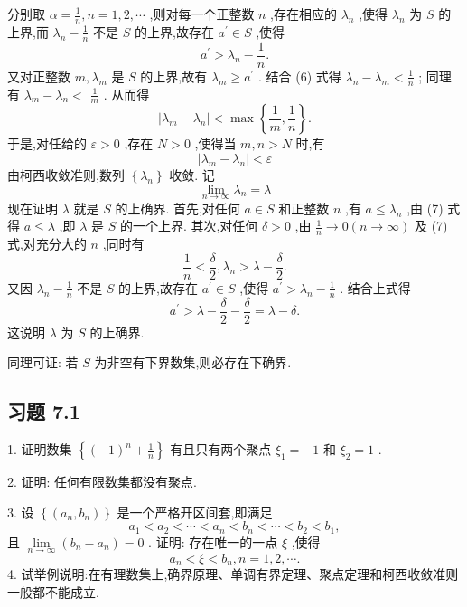 分别取 \(\alpha  = \frac{1}{n},n = 1,2,\cdots\) ,则对每一个正整数 \(n\) ,存在相应的 \({\lambda }_{n}\) ,使得 \({\lambda }_{n}\) 为 \(S\) 的上界,而 \({\lambda }_{n} - \frac{1}{n}\) 不是 \(S\) 的上界,故存在 \({a}^{\prime } \in  S\) ,使得
\[
{a}^{\prime } > {\lambda }_{n} - \frac{1}{n}. \tag{6}
\]
又对正整数 \(m,{\lambda }_{m}\) 是 \(S\) 的上界,故有 \({\lambda }_{m} \geq  {a}^{\prime }\) . 结合 (6) 式得 \({\lambda }_{n} - {\lambda }_{m} < \frac{1}{n}\) ; 同理有 \({\lambda }_{m} - {\lambda }_{n} <\)  \(\frac{1}{m}\) . 从而得
\[
\left| {{\lambda }_{m} - {\lambda }_{n}}\right|  < \max \left\{  {\frac{1}{m},\frac{1}{n}}\right\}  .
\]
于是,对任给的 \(\varepsilon  > 0\) ,存在 \(N > 0\) ,使得当 \(m,n > N\) 时,有
\[
\left| {{\lambda }_{m} - {\lambda }_{n}}\right|  < \varepsilon
\]
由柯西收敛准则,数列 \(\left\{  {\lambda }_{n}\right\}\) 收敛. 记
\[
\mathop{\lim }\limits_{{n \rightarrow  \infty }}{\lambda }_{n} = \lambda  \tag{7}
\]
现在证明 \(\lambda\) 就是 \(S\) 的上确界. 首先,对任何 \(a \in  S\) 和正整数 \(n\) ,有 \(a \leq  {\lambda }_{n}\) ,由 (7) 式得 \(a \leq  \lambda\) ,即 \(\lambda\) 是 \(S\) 的一个上界. 其次,对任何 \(\delta  > 0\) ,由 \(\frac{1}{n} \rightarrow  0\left( {n \rightarrow  \infty }\right)\) 及 (7) 式,对充分大的 \(n\) ,同时有
\[
\frac{1}{n} < \frac{\delta }{2},{\lambda }_{n} > \lambda  - \frac{\delta }{2}.
\]
又因 \({\lambda }_{n} - \frac{1}{n}\) 不是 \(S\) 的上界,故存在 \({a}^{\prime } \in  S\) ,使得 \({a}^{\prime } > {\lambda }_{n} - \frac{1}{n}\) . 结合上式得
\[
{a}^{\prime } > \lambda  - \frac{\delta }{2} - \frac{\delta }{2} = \lambda  - \delta .
\]
这说明 \(\lambda\) 为 \(S\) 的上确界.

同理可证: 若 \(S\) 为非空有下界数集,则必存在下确界.

\subsection{习题 7.1}

1. 证明数集 \(\left\{  {{\left( -1\right) }^{n} + \frac{1}{n}}\right\}\) 有且只有两个聚点 \({\xi }_{1} =  - 1\) 和 \({\xi }_{2} = 1\) .

2. 证明: 任何有限数集都没有聚点.

3. 设 \(\left\{  \left( {{a}_{n},{b}_{n}}\right) \right\}\) 是一个严格开区间套,即满足
\[
{a}_{1} < {a}_{2} < \cdots  < {a}_{n} < {b}_{n} < \cdots  < {b}_{2} < {b}_{1},
\]
且 \(\mathop{\lim }\limits_{{n \rightarrow  \infty }}\left( {{b}_{n} - {a}_{n}}\right)  = 0\) . 证明: 存在唯一的一点 \(\xi\) ,使得
\[
{a}_{n} < \xi  < {b}_{n},n = 1,2,\cdots .
\]
4. 试举例说明:在有理数集上,确界原理、单调有界定理、聚点定理和柯西收敛准则一般都不能成立.

